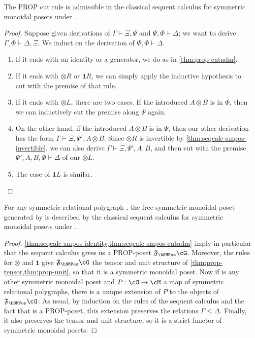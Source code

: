 \documentclass{book}
\let\types\vdash
\newcommand{\F}[1]{\mathfrak{F}_{#1}}
\def\one{\mathbf{1}}
\let\tensor\otimes
\def\tensorL{\mathord{\tensor}L}
\def\tensorR{\mathord{\tensor}R}
\begin{document}
\begin{thm}\label{thm:seqcalc-smpos-cutadm}
  The PROP cut rule is admissible in the classical sequent calculus for symmetric monoidal posets under \cG.
\end{thm}
\begin{proof}
  Suppose given derivations of $\Gamma\types\Xi,\Psi$ and $\Psi,\Phi \types \Delta$; we want to derive $\Gamma,\Phi \types \Delta,\Xi$.
  We induct on the derivation of $\Psi,\Phi \types \Delta$.
  \begin{enumerate}
  \item If it ends with an identity or a generator, we do as in \cref{thm:prop-cutadm}.
  \item If it ends with $\tensorR$ or $\one R$, we can simply apply the inductive hypothesis to cut with the premise of that rule.
  \item If it ends with $\tensorL$, there are two cases.
    If the introduced $A\tensor B$ is in $\Phi$, then we can inductively cut the premise along $\Psi$ again.
  \item On the other hand, if the introduced $A\tensor B$ is in $\Psi$, then our other derivation has the form $\Gamma\types\Xi,\Psi',A\tensor B$.
    Since $\tensorR$ is invertible by \cref{thm:seqcalc-smpos-invertible}, we can also derive $\Gamma\types\Xi,\Psi',A,B$, and then cut with the premise $\Psi',A,B,\Phi \types \Delta$ of our $\tensorL$.
  \item The case of $\one L$ is similar.\qedhere
  \end{enumerate}
\end{proof}

\begin{thm}\label{thm:seqcalc-smpos-initial}
  For any symmetric relational polygraph \cG, the free symmetric monoidal poset generated by \cG is described by the classical sequent calculus for symmetric monoidal posets under \cG.
\end{thm}
\begin{proof}
  \cref{thm:seqcalc-smpos-identity,thm:seqcalc-smpos-cutadm} imply in particular that the sequent calculus gives us a PROP-poset $\F\bSMPos\cG$.
  Moreover, the rules for $\tensor$ and $\one$ give $\F\bSMPos\cG$ the tensor and unit structure of \cref{thm:prop-tensor,thm:prop-unit}, so that it is a symmetric monoidal poset.
  Now if \cM is any other symmetric monoidal poset and $P:\cG\to\cM$ a map of symmetric relational polygraphs, there is a unique extension of $P$ to the objects of $\F\bSMPos\cG$.
  As usual, by induction on the rules of the sequent calculus and the fact that \cM is a PROP-poset, this extension preserves the relations $\Gamma\le\Delta$.
  Finally, it also preserves the tensor and unit structure, so it is a strict functor of symmetric monoidal posets.
\end{proof}
\end{document}
